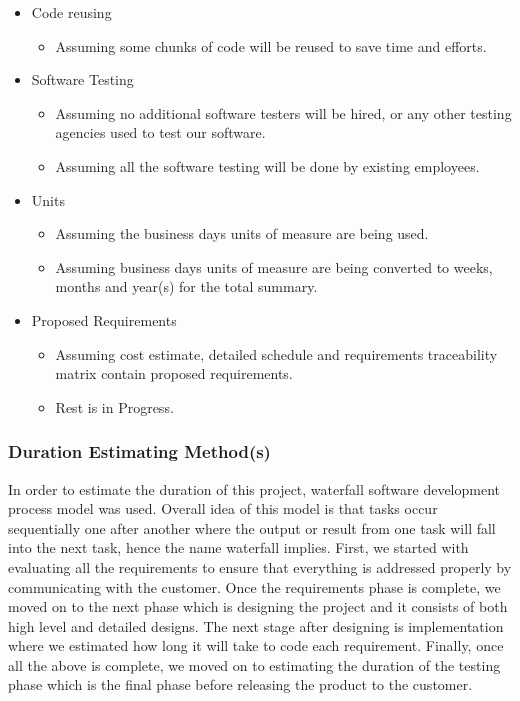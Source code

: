 \documentclass{article}
\begin{document}
\begin{itemize}
\begin{itemize}
  \end{itemize}
\item Code reusing
  \begin{itemize}
  \item Assuming some chunks of code will be reused to save time and efforts.
  \end{itemize}
\item Software Testing
  \begin{itemize}
  \item Assuming no additional software testers will be hired, or any other testing agencies used to test our software.
  \item Assuming all the software testing will be done by existing employees.
  \end{itemize}
\item Units
  \begin{itemize}
  \item Assuming the business days units of measure are being used.
  \item Assuming business days units of measure are being converted to weeks, months and year(s) for the total summary.
  \end{itemize}
\item Proposed Requirements
  \begin{itemize}
  \item Assuming cost estimate, detailed schedule and requirements traceability matrix contain proposed requirements.
  \item Rest is in Progress.
  \end{itemize}
\end{itemize}

\subsubsection{Duration Estimating Method(s)}
\par In order to estimate the duration of this project, waterfall
software development process model was used. Overall idea of this
model is that tasks occur sequentially one after another where the
output or result from one task will fall into the next task, hence the
name waterfall implies. First, we started with evaluating all the
requirements to ensure that everything is addressed properly by
communicating with the customer. Once the requirements phase is
complete, we moved on to the next phase which is designing the project
and it consists of both high level and detailed designs. The next
stage after designing is implementation where we estimated how long it
will take to code each requirement. Finally, once all the above is
complete, we moved on to estimating the duration of the testing phase
which is the final phase before releasing the product to the customer.
\end{document}
